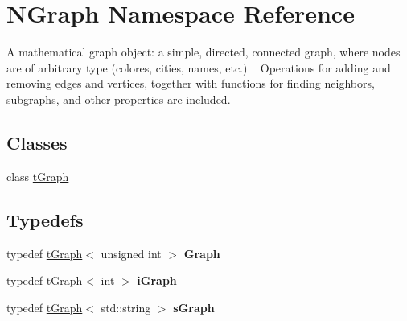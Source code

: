 \hypertarget{namespace_n_graph}{}\section{N\+Graph Namespace Reference}
\label{namespace_n_graph}


A mathematical graph object\+: a simple, directed, connected graph, where nodes are of arbitrary type (colores, cities, names, etc.) ~\newline
 Operations for adding and removing edges and vertices, together with functions for finding neighbors, subgraphs, and other properties are included.  


\subsection*{Classes}
\begin{DoxyCompactItemize}
\item 
class \mbox{\hyperlink{class_n_graph_1_1t_graph}{t\+Graph}}
\end{DoxyCompactItemize}
\subsection*{Typedefs}
\begin{DoxyCompactItemize}
\item 
\mbox{\label{namespace_n_graph_a397e01b6d7caaaf603e67c1a87f11048}} 
typedef \mbox{\hyperlink{class_n_graph_1_1t_graph}{t\+Graph}}$<$ unsigned int $>$ {\bfseries Graph}
\item 
\mbox{\label{namespace_n_graph_a00343a4aa68bb7a338a89a778942701f}} 
typedef \mbox{\hyperlink{class_n_graph_1_1t_graph}{t\+Graph}}$<$ int $>$ {\bfseries i\+Graph}
\item 
\mbox{\label{namespace_n_graph_a7b2d8922d00fae3af037b172b39fd524}} 
typedef \mbox{\hyperlink{class_n_graph_1_1t_graph}{t\+Graph}}$<$ std\+::string $>$ {\bfseries s\+Graph}
\end{DoxyCompactItemize}
